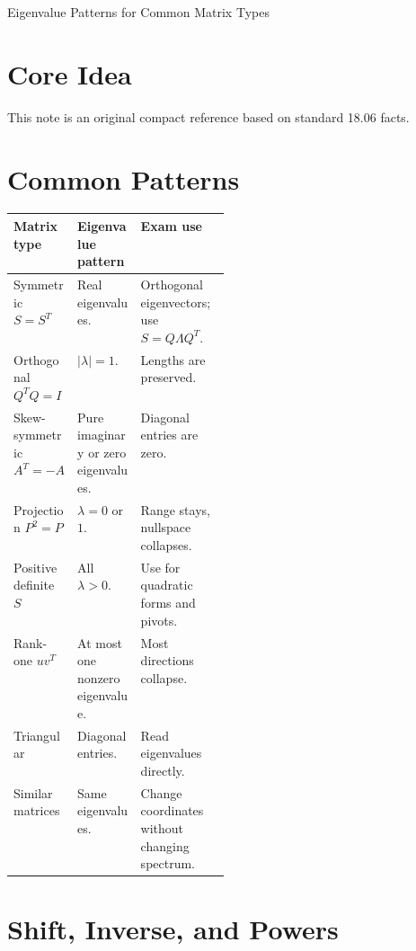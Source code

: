 \documentclass[10pt]{article}
\begin{document}
\begin{center}
{\LARGE Eigenvalue Patterns for Common Matrix Types\par}
\end{center}

\section{Core Idea}


This note is an original compact reference based on standard 18.06 facts.

\section{Common Patterns}

\begin{center}
\small
\begin{tabularx}{\linewidth}{@{}L{0.28\linewidth}Y Y@{}}
\toprule
Matrix type & Eigenvalue pattern & Exam use \\
\midrule
Symmetric \(S=S^{T}\) & Real eigenvalues. & Orthogonal eigenvectors; use \(S=Q\Lambda Q^{T}\). \\
Orthogonal \(Q^{T}Q=I\) & \(|\lambda|=1\). & Lengths are preserved. \\
Skew-symmetric \(A^{T}=-A\) & Pure imaginary or zero eigenvalues. & Diagonal entries are zero. \\
Projection \(P^{2}=P\) & \(\lambda=0\) or \(1\). & Range stays, nullspace collapses. \\
Positive definite \(S\) & All \(\lambda>0\). & Use for quadratic forms and pivots. \\
Rank-one \(uv^{T}\) & At most one nonzero eigenvalue. & Most directions collapse. \\
Triangular & Diagonal entries. & Read eigenvalues directly. \\
Similar matrices & Same eigenvalues. & Change coordinates without changing spectrum. \\
\bottomrule
\end{tabularx}
\end{center}

\section{Shift, Inverse, and Powers}
\end{document}

